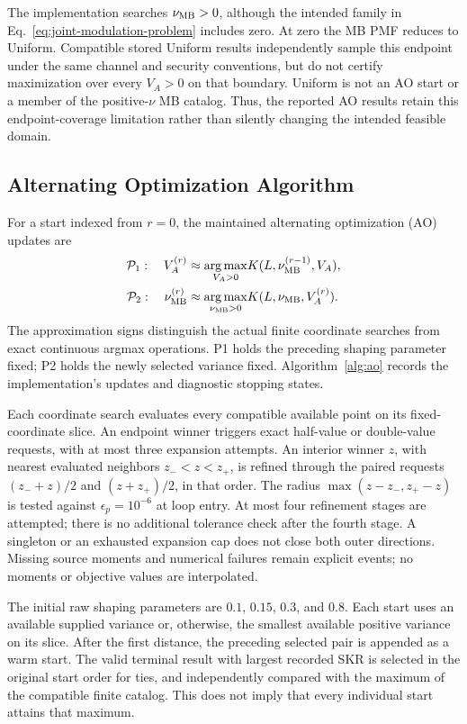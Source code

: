 The implementation searches $\nu_{\rm MB}>0$, although the intended family
in Eq.~\eqref{eq:joint-modulation-problem} includes zero. At zero the MB PMF
reduces to Uniform. Compatible stored Uniform results independently sample
this endpoint under the same channel and security conventions, but do not
certify maximization over every $V_A>0$ on that boundary. Uniform is not an
AO start or a member of the positive-$\nu$ MB catalog. Thus, the reported AO
results retain this endpoint-coverage limitation rather than silently changing
the intended feasible domain.

\subsection{Alternating Optimization Algorithm}
For a start indexed from $r=0$, the maintained alternating optimization (AO)
updates are
\begin{align}
 \mathcal P_1:\quad V_A^{(r)}&\approx\underset{V_A>0}{\arg\max}
 K(L,\nu_{\rm MB}^{(r-1)},V_A),\label{eq:p1}\\
 \mathcal P_2:\quad \nu_{\rm MB}^{(r)}&\approx\underset{\nu_{\rm MB}>0}{\arg\max}
 K(L,\nu_{\rm MB},V_A^{(r)}).\label{eq:p2}
\end{align}
The approximation signs distinguish the actual finite coordinate searches from
exact continuous argmax operations. P1 holds the preceding shaping parameter
fixed; P2 holds the newly selected variance fixed. Algorithm~\ref{alg:ao}
records the implementation's updates and diagnostic stopping states.

Each coordinate search evaluates every compatible available point on its
fixed-coordinate slice. An endpoint winner triggers exact half-value or
double-value requests, with at most three expansion attempts. An interior
winner $z$, with nearest evaluated neighbors $z_-<z<z_+$, is refined through
the paired requests $(z_-+z)/2$ and $(z+z_+)/2$, in that order. The radius
$\max(z-z_-,z_+-z)$ is tested against $\epsilon_p=10^{-6}$ at loop entry.
At most four refinement stages are attempted; there is no additional tolerance
check after the fourth stage. A singleton or an exhausted expansion cap does
not close both outer directions. Missing source moments and numerical failures
remain explicit events; no moments or objective values are interpolated.

The initial raw shaping parameters are $0.1$, $0.15$, $0.3$, and $0.8$.
Each start uses an available supplied variance or, otherwise, the smallest
available positive variance on its slice. After the first distance, the
preceding selected pair is appended as a warm start. The valid terminal result
with largest recorded SKR is selected in the original start order for ties,
and independently compared with the maximum of the compatible finite catalog.
This does not imply that every individual start attains that maximum.

